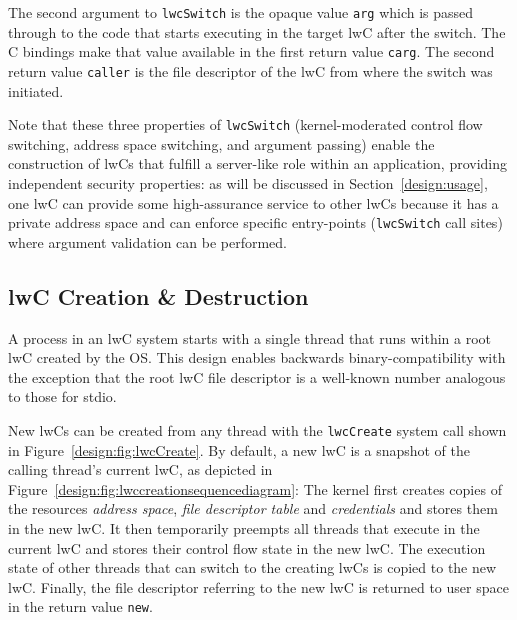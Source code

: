 \documentclass[10pt,twocolumn,a4paper]{article}
\begin{document}
The second argument to \lstinline{lwcSwitch} is the opaque value \lstinline{arg} which is passed through to the code that starts executing in the target lwC after the switch.
The C bindings make that value available in the first return value \lstinline{carg}.
The second return value \lstinline{caller} is the file descriptor of the lwC from where the switch was initiated.
\cite{lwcpaper}

Note that these three properties of \lstinline{lwcSwitch} (kernel-moderated control flow switching, address space switching, and argument passing) enable the construction of lwCs that fulfill a server-like role within an application, providing independent security properties:
as will be discussed in Section~\ref{design:usage}, one lwC can provide some high-assurance service to other lwCs because it has a private address space and can enforce specific entry-points (\lstinline{lwcSwitch} call sites) where argument validation can be performed.


\subsection{lwC Creation \& Destruction}\label{design:createdestroy}
A process in an lwC system starts with a single thread that runs within a root lwC created by the OS.
This design enables backwards binary-compatibility with the exception that the root lwC file descriptor is a well-known number analogous to those for stdio.
\cite{lwcpaper}

New lwCs can be created from any thread with the \lstinline{lwcCreate} system call shown in Figure~\ref{design:fig:lwcCreate}.
By default, a new lwC is a snapshot of the calling thread's current lwC, as depicted in Figure~\ref{design:fig:lwccreationsequencediagram}:
The kernel first creates copies of the resources \textit{address space}, \textit{file descriptor table} and \textit{credentials} and stores them in the new lwC.
It then temporarily preempts all threads that execute in the current lwC and stores their control flow state in the new lwC.
The execution state of other threads that can switch to the creating lwCs is copied to the new lwC.
Finally, the file descriptor referring to the new lwC is returned to user space in the return value \lstinline{new}.
\cite{lwcpaper}
\end{document}
